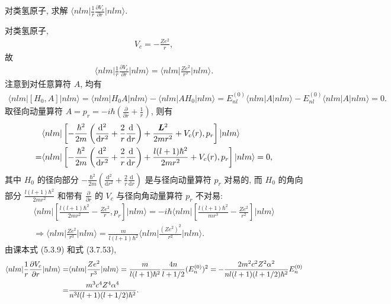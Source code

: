\documentclass{assignment}
\begin{document}
\begin{prob}[补充习题]
    对类氢原子, 求解 $\langle nlm\rvert\frac{1}{r}\frac{\partial V_c}{\partial r}\lvert nlm\rangle$.
\end{prob}
\begin{sol}
    对类氢原子,
    \begin{align}
        V_c=-\frac{Ze^2}{r},
    \end{align}
    故
    \begin{align}
        \langle nlm\rvert\frac{1}{r}\frac{\partial V_c}{\partial r}\lvert nlm\rangle=\langle nlm\rvert\frac{Ze^2}{r^3}\lvert nlm\rangle.
    \end{align}
    注意到对任意算符 $A$, 均有
    \begin{align}
        \langle nlm\rvert[H_0,A]\lvert nlm\rangle=\langle nlm\rvert H_0A\lvert nlm\rangle-\langle nlm\rvert AH_0\rvert nlm\rangle=E_{nl}^{(0)}\langle nlm\rvert A\lvert nlm\rangle-E_{nl}^{(0)}\langle nlm\rvert A\lvert nlm\rangle=0.
    \end{align}
    取径向动量算符 $A=p_r=-i\hbar\left(\frac{\partial}{\partial r}+\frac{1}{r}\right)$, 则有
    \begin{align}
        \notag&\langle nlm\rvert\left[-\frac{\hbar^2}{2m}\left(\frac{\mathrm{d}^2}{\mathrm{d}r^2}+\frac{2}{r}\frac{\mathrm{d}}{\mathrm{d}r}\right)+\frac{\bm{L}^2}{2mr^2}+V_c(r),p_r\right]\lvert nlm\rangle\\
        =&\langle nlm\rvert\left[-\frac{\hbar^2}{2m}\left(\frac{\mathrm{d}^2}{\mathrm{d}r^2}+\frac{2}{r}\frac{\mathrm{d}}{\mathrm{d}r}\right)+\frac{l(l+1)\hbar^2}{2mr^2}+V_c(r),p_r\right]\lvert nlm\rangle=0,
    \end{align}
    其中 $H_0$ 的径向部分 $-\frac{\hbar^2}{2m}\left(\frac{\mathrm{d}^2}{\mathrm{d}r^2}+\frac{2}{r}\frac{\mathrm{d}}{\mathrm{d}r}\right)$ 是与径向动量算符 $p_r$ 对易的, 而 $H_0$ 的角向部分 $\frac{l(l+1)\hbar^2}{2mr^2}$ 和带有 $\frac{\partial}{\partial r}$ 的 $V_c$ 与径向角动量算符 $p_r$ 不对易:
    \begin{gather}
        \langle nlm\rvert\left[\frac{l(l+1)\hbar^2}{2mr^2}-\frac{Ze^2}{r},p_r\right]\lvert nlm\rangle=-i\hbar\langle nlm\rvert\left[\frac{l(l+1)\hbar^2}{mr^3}-\frac{Ze^2}{r^2}\right]\lvert nlm\rangle\\
        \Longrightarrow\langle nlm\rvert\frac{Ze^2}{r^3}\lvert nlm\rangle=\frac{m}{l(l+1)\hbar^2}\langle nlm\rvert\frac{(Ze^2)^2}{r^2}\lvert nlm\rangle.
    \end{gather}
    由课本式 (5.3.9) 和式 (3.7.53),
    \begin{align}
        \notag\langle nlm\rvert\frac{1}{r}\frac{\partial V_c}{\partial r}\lvert nlm\rangle=&\langle nlm\rvert\frac{Ze^2}{r^3}\lvert nlm\rangle=\frac{m}{l(l+1)\hbar^2}\frac{4n}{l+1/2}(E_n^{(0)})^2=-\frac{2m^2c^2Z^2\alpha^2}{nl(l+1)(l+1/2)\hbar^2}E_n^{(0)}\\
        =&\frac{m^3c^4Z^4\alpha^4}{n^3l(l+1)(l+1/2)\hbar^2}.
    \end{align}
\end{sol}
\end{document}
